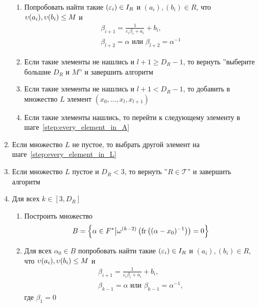 \documentclass[_00_autoref.tex]{subfiles}
\begin{document}
\begin{enumerate}
\begin{enumerate}
            \item Попробовать найти такие $(\varepsilon_i) \in I_{R}$ и $(a_i), (b_i) \in R$, что $\upsilon(a_i),\upsilon(b_i) \le M$ и
            \begin{equation*}
                \begin{split}
                    \beta_{i+1}=\frac{1}{\varepsilon_i \beta_i + a_i} + b_i,\\
                    \beta_{l+2}=\alpha \textrm{ или } \beta_{l+2}=\alpha^{-1}
                \end{split}
            \end{equation*}

            \item Если такие элементы не нашлись и $l+1 \ge D_R - 1$, то вернуть ''выберите большие $D_R$ и $M$'' и завершить алгоритм
            
            \item Если такие элементы не нашлись и $l+1 < D_R - 1$, то добавить в множество $L$ элемент $(x_0,\ldots,x_l,x_{l+1})$
            
            \item Если такие элементы нашлись, то перейти к следующему элементу в шаге~\ref{step:every_element_in_A}
        \end{enumerate}

        \item Если множество $L$ не пустое, то выбрать другой элемент на шаге~\ref{step:every_element_in_L}
        
        \item Если множество $L$ пустое и $D_R < 3$, то вернуть ''$R \in \mathcal{T}$'' и завершить алгоритм
        
        \item Для всех $k \in [3, D_R]$
        \begin{enumerate}
            \item Построить множество
            \begin{equation*}
                B = \left\{
                    \alpha \in F^{*} \big| \omega^{(k-2)}\left(
                        \textrm{fr}\left((\alpha-x_0)^{-1}\right)
                    \right) = 0
                \right\}
            \end{equation*}

            \item Для всех $\alpha_0 \in B$ попробовать найти такие $(\varepsilon_i) \in I_{R}$ и $(a_i), (b_i) \in R$, что $\upsilon(a_i), \upsilon(b_i) \le M$ и
            \begin{equation*}
                \begin{split}
                    \beta_{i + 1} = \frac{1}{\varepsilon_i \beta_i + a_i} + b_i,\\
                    \beta_{k - 1} = \alpha \textrm{ или } \beta_{k-1} = \alpha^{-1},
                \end{split}
            \end{equation*}
            где $\beta_1 = 0$


\end{enumerate}
\end{enumerate}
\end{document}
